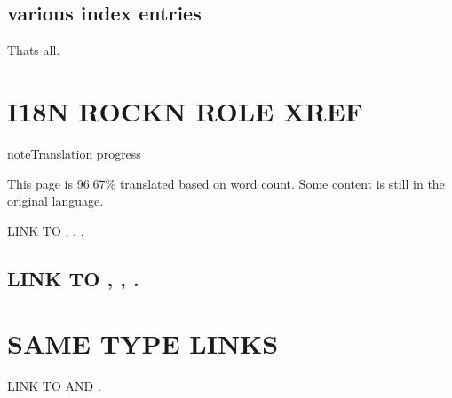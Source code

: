 \documentclass[letterpaper,10pt,english]{sphinxmanual}
\begin{document}
\section{various index entries}
\label{\detokenize{index_entries:various-index-entries}}
\ignorespaces 
\sphinxAtStartPar
That\textquotesingle{}s all.

\sphinxstepscope


\chapter{I18N ROCK\textquotesingle{}N ROLE XREF}
\label{\detokenize{role_xref:i18n-role-xref}}\label{\detokenize{role_xref:id1}}\label{\detokenize{role_xref::doc}}
\begin{sphinxadmonition}{note}{Translation progress}

\sphinxAtStartPar
This page is 96.67\% translated based on word count. Some content is still in the original language.
\end{sphinxadmonition}

\sphinxAtStartPar
LINK TO {\hyperref[\detokenize{role_xref:i18n-role-xref}]{}}, {\hyperref[\detokenize{index::doc}]{}}, {\hyperref[\detokenize{glossary_terms:term-Some-term}]{}}.


\section{LINK TO {\hyperref[\detokenize{role_xref:i18n-role-xref}]{}}, {\hyperref[\detokenize{index::doc}]{}}, {\hyperref[\detokenize{glossary_terms:term-Some-term}]{}}.}
\label{\detokenize{role_xref:link-to-some-term-i18n-role-xref-index}}

\chapter{SAME TYPE LINKS}
\label{\detokenize{role_xref:same-type-links}}\label{\detokenize{role_xref:id2}}
\sphinxAtStartPar
LINK TO {\hyperref[\detokenize{glossary_terms:term-Some-other-term}]{}} AND {\hyperref[\detokenize{glossary_terms:term-Some-term}]{}}.
\end{document}
